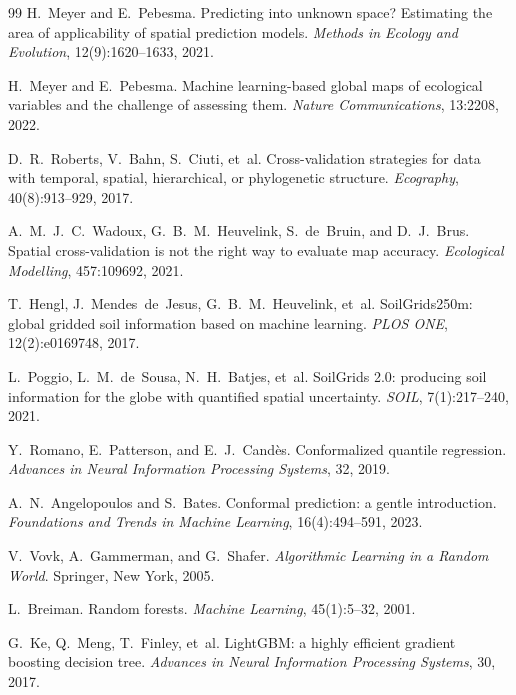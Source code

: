 \begin{thebibliography}{99}
H.~Meyer and E.~Pebesma.
\newblock Predicting into unknown space? Estimating the area of applicability of spatial prediction models.
\newblock \emph{Methods in Ecology and Evolution}, 12(9):1620--1633, 2021.

H.~Meyer and E.~Pebesma.
\newblock Machine learning-based global maps of ecological variables and the challenge of assessing them.
\newblock \emph{Nature Communications}, 13:2208, 2022.

D.~R.~Roberts, V.~Bahn, S.~Ciuti, et~al.
\newblock Cross-validation strategies for data with temporal, spatial, hierarchical, or phylogenetic structure.
\newblock \emph{Ecography}, 40(8):913--929, 2017.

A.~M.~J.~C.~Wadoux, G.~B.~M.~Heuvelink, S.~de~Bruin, and D.~J.~Brus.
\newblock Spatial cross-validation is not the right way to evaluate map accuracy.
\newblock \emph{Ecological Modelling}, 457:109692, 2021.

T.~Hengl, J.~Mendes~de~Jesus, G.~B.~M.~Heuvelink, et~al.
\newblock SoilGrids250m: global gridded soil information based on machine learning.
\newblock \emph{PLOS ONE}, 12(2):e0169748, 2017.

L.~Poggio, L.~M.~de~Sousa, N.~H.~Batjes, et~al.
\newblock SoilGrids 2.0: producing soil information for the globe with quantified spatial uncertainty.
\newblock \emph{SOIL}, 7(1):217--240, 2021.

Y.~Romano, E.~Patterson, and E.~J.~Cand\`es.
\newblock Conformalized quantile regression.
\newblock \emph{Advances in Neural Information Processing Systems}, 32, 2019.

A.~N.~Angelopoulos and S.~Bates.
\newblock Conformal prediction: a gentle introduction.
\newblock \emph{Foundations and Trends in Machine Learning}, 16(4):494--591, 2023.

V.~Vovk, A.~Gammerman, and G.~Shafer.
\newblock \emph{Algorithmic Learning in a Random World}.
\newblock Springer, New York, 2005.

L.~Breiman.
\newblock Random forests.
\newblock \emph{Machine Learning}, 45(1):5--32, 2001.

G.~Ke, Q.~Meng, T.~Finley, et~al.
\newblock LightGBM: a highly efficient gradient boosting decision tree.
\newblock \emph{Advances in Neural Information Processing Systems}, 30, 2017.


\end{thebibliography}
